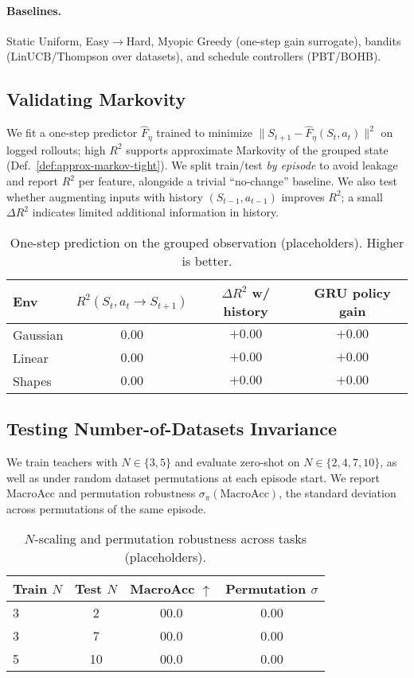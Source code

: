 \documentclass[11pt]{article}
\newcommand{\MacroAcc}{\mathrm{MacroAcc}}
\newcommand{\1}{\mathbf{1}}
\begin{document}
\paragraph{Baselines.}
Static Uniform, Easy$\to$Hard, Myopic Greedy (one-step gain surrogate), bandits (LinUCB/Thompson over datasets), and schedule controllers (PBT/BOHB).

\subsection{Validating Markovity}\label{sec:markov-exp}
We fit a one-step predictor $\hat{F}_\eta$ trained to minimize $\|S_{t+1}-\hat{F}_\eta(S_t,a_t)\|^2$ on logged rollouts; high $R^2$ supports approximate Markovity of the grouped state (Def.~\ref{def:approx-markov-tight}).
We split train/test \emph{by episode} to avoid leakage and report $R^2$ per feature, alongside a trivial ``no-change'' baseline.
We also test whether augmenting inputs with history $(S_{t-1},a_{t-1})$ improves $R^2$; a small $\Delta R^2$ indicates limited additional information in history.
\begin{table}[H]
\centering
\caption{One-step prediction on the grouped observation (placeholders). Higher is better.}
\label{tab:markov}
\begin{tabular}{lccc}
\toprule
Env & $R^2(S_t,a_t\!\to\!S_{t+1})$ & $\Delta R^2$ w/ history & GRU policy gain \\
\midrule
Gaussian & $0.00$ & $+0.00$ & $+0.00$ \\
Linear & $0.00$ & $+0.00$ & $+0.00$ \\
Shapes & $0.00$ & $+0.00$ & $+0.00$ \\
\bottomrule
\end{tabular}
\end{table}

\subsection{Testing Number-of-Datasets Invariance}
We train teachers with $N\in\{3,5\}$ and evaluate zero-shot on $N\in\{2,4,7,10\}$, as well as under random dataset permutations at each episode start.
We report MacroAcc and permutation robustness $\sigma_\pi(\MacroAcc)$, the standard deviation across permutations of the same episode.
\begin{table}[H]
\centering
\caption{$N$-scaling and permutation robustness across tasks (placeholders).}
\label{tab:ninvariance}
\begin{tabular}{lccc}
\toprule
Train $N$ & Test $N$ & MacroAcc $\uparrow$ & Permutation $\sigma$ \\
\midrule
3 & 2 & 00.0 & 0.00 \\
3 & 7 & 00.0 & 0.00 \\
5 & 10 & 00.0 & 0.00 \\
\bottomrule
\end{tabular}
\end{table}
\end{document}
